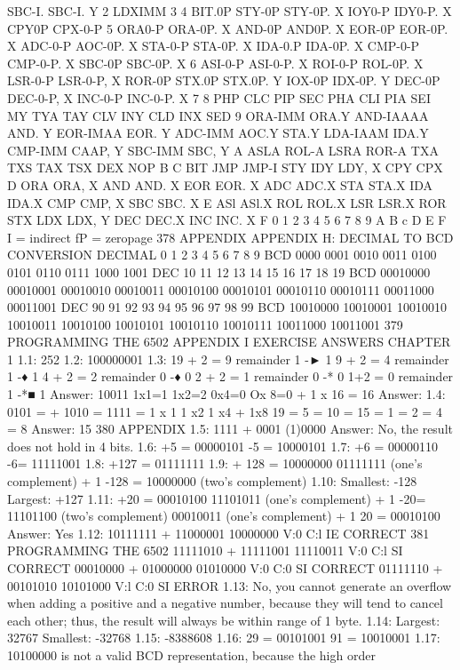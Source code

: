 \documentclass{book}
\begin{document}
{{{{{{{{{{{{{{{{{{{{{{{{{{{{{{{{{{{{{{{{{{{{{{{{{{{{{{{{{{{{{{{{{{{{{{{{{{{{{{{{{{{{{{{{{{{{{{{{{{{{{{{{{{{{{{{{{{{{{{{{{{{{{{{{{{{{{{{{{{{{SBC-I.
SBC-I. Y
2
LDXIMM
3 4
BIT.0P
STY-0P
STY-0P. X
IOY0-P
IDY0-P. X
CPY0P
CPX-0-P
5
ORA0-P
ORA-0P. X
AND-0P
AND0P. X
EOR-0P
EOR-0P. X
ADC-0-P
AOC-0P. X
STA-0-P
STA-0P. X
IDA-0.P
IDA-0P. X
CMP-0-P
CMP-0-P. X
SBC-0P
SBC-0P. X
6
ASI-0-P
ASI-0-P. X
ROI-0-P
ROL-0P. X
LSR-0-P
LSR-0-P, X
ROR-0P
STX.0P
STX.0P. Y
IOX-0P
IDX-0P. Y
DEC-0P
DEC-0-P, X
INC-0-P
INC-0-P. X
7
8
PHP
CLC
PIP
SEC
PHA
CLI
PIA
SEI
MY
TYA
TAY
CLV
INY
CLD
INX
SED
9
ORA-IMM
ORA.Y
AND-IAAAA
AND. Y
EOR-IMAA
EOR. Y
ADC-IMM
AOC.Y
STA.Y
LDA-IAAM
IDA.Y
CMP-IMM
CAAP, Y
SBC-IMM
SBC, Y
A
ASLA
ROL-A
LSRA
ROR-A
TXA
TXS
TAX
TSX
DEX
NOP
B C
BIT
JMP
JMP-I
STY
IDY
LDY, X
CPY
CPX
D
ORA
ORA, X
AND
AND. X
EOR
EOR. X
ADC
ADC.X
STA
STA.X
IDA
IDA.X
CMP
CMP, X
SBC
SBC. X
E
ASl
ASl.X
ROL
ROL.X
LSR
LSR.X
ROR
STX
LDX
LDX, Y
DEC
DEC.X
INC
INC. X
F
0
1
2
3
4
5
6
7
8
9
A
B
c
D
E
F
I = indirect
fP = zeropage
378
APPENDIX
APPENDIX H:
DECIMAL TO BCD CONVERSION
DECIMAL
0
1
2
3
4
5
6
7
8
9
BCD
0000
0001
0010
0011
0100
0101
0110
0111
1000
1001
DEC
10
11
12
13
14
15
16
17
18
19
BCD
00010000
00010001
00010010
00010011
00010100
00010101
00010110
00010111
00011000
00011001
DEC
90
91
92
93
94
95
96
97
98
99
BCD
10010000
10010001
10010010
10010011
10010100
10010101
10010110
10010111
10011000
10011001
379
PROGRAMMING THE 6502
APPENDIX I
EXERCISE ANSWERS
CHAPTER 1
1.1: 252
1.2: 100000001
1.3: 19 + 2 = 9 remainder 1 -► 1
9 + 2 = 4 remainder 1 -♦ 1
4 + 2 = 2 remainder 0 -♦ 0
2 + 2 = 1 remainder 0 -* 0
1+2 = 0 remainder 1 -*■ 1
Answer: 10011
1x1=1
1x2=2
0x4=0
Ox 8=0
+ 1 x 16 = 16
Answer:
1.4: 0101 =
+ 1010 =
1111 =
1 x 1
1 x2
1 x4
+ 1x8
19
= 5
= 10
= 15
= 1
= 2
= 4
= 8
Answer: 15
380
APPENDIX
1.5: 1111
+ 0001
(1)0000
Answer: No, the result does not hold in 4 bits.
1.6: +5 = 00000101
-5 = 10000101
1.7: +6 = 00000110
-6= 11111001
1.8: +127 = 01111111
1.9: + 128 = 10000000
01111111 (one's complement)
+ 1
-128 = 10000000 (two's complement)
1.10: Smallest: -128
Largest: +127
1.11: +20 = 00010100
11101011 (one's complement)
+ 1
-20= 11101100 (two's complement)
00010011 (one's complement)
+ 1
20 = 00010100
Answer: Yes
1.12: 10111111
+ 11000001
10000000
V:0 C:l
IE CORRECT
381
PROGRAMMING THE 6502
11111010
+ 11111001
11110011
V:0 C:l
SI CORRECT
00010000
+ 01000000
01010000
V:0 C:0
SI CORRECT
01111110
+ 00101010
10101000
V:l C:0
SI ERROR
1.13: No, you cannot generate an overflow when adding a positive and a
negative number, because they will tend to cancel each other; thus,
the result will always be within range of 1 byte.
1.14: Largest: 32767
Smallest: -32768
1.15: -8388608
1.16: 29 = 00101001
91 = 10010001
1.17: 10100000 is not a valid BCD representation, because the high order
}}}}}}}}}}}}}}}}}}}}}}}}}}}}}}}}}}}}}}}}}}}}}}}}}}}}}}}}}}}}}}}}}}}}}}}}}}}}}}}}}}}}}}}}}}}}}}}}}}}}}}}}}}}}}}}}}}}}}}}}}}}}}}}}}}}}}}}}}}}}
\end{document}

